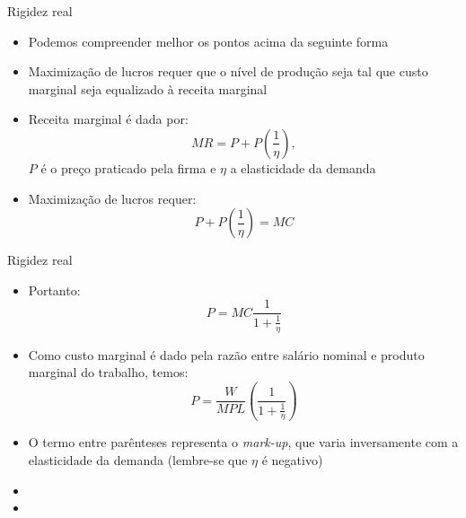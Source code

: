 \documentclass[10pt]{beamer}
\begin{document}
\begin{frame}{Rigidez real}
    \begin{itemize}
        \item Podemos compreender melhor os pontos acima da seguinte forma\bigskip
        \item Maximização de lucros requer que o nível de produção seja tal que custo marginal seja equalizado à receita marginal\bigskip
        \item Receita marginal é dada por:
        \begin{equation}
            MR = P + P\left(\frac{1}{\eta} \right),
        \end{equation}
        $P$ é o preço praticado pela firma e $\eta$ a elasticidade da demanda\bigskip
        \item Maximização de lucros requer:
        \begin{equation}
            P + P\left(\frac{1}{\eta} \right) = MC
        \end{equation}
    \end{itemize}
\end{frame}

\begin{frame}{Rigidez real}
    \begin{itemize}
        \item Portanto:
        \begin{equation}
            P = MC \frac{1}{1 + \frac{1}{\eta}}
        \end{equation}
        \item Como custo marginal é dado pela razão entre salário nominal e produto marginal do trabalho, temos:
        \begin{equation}
            P = \frac{W}{MPL}\left(\frac{1}{1 + \frac{1}{\eta}}\right)
        \end{equation}
        \item O termo entre parênteses representa o \emph{mark-up}, que varia inversamente com a elasticidade da demanda (lembre-se que $\eta$ é negativo)\bigskip
        \item {}\bigskip
        \item {}
    \end{itemize}
\end{frame}
\end{document}

